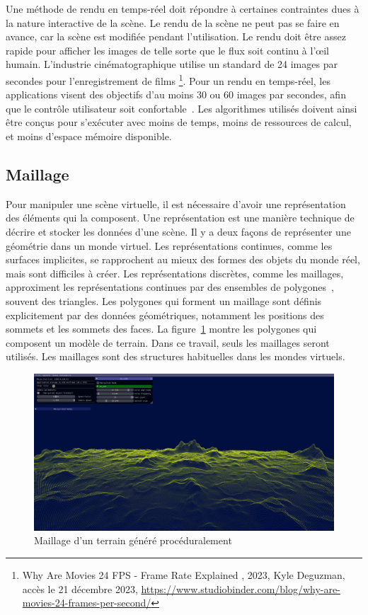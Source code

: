 Une méthode de rendu en temps-réel doit répondre à certaines contraintes dues à la nature interactive de la scène. Le rendu de la scène ne peut pas se faire en avance, car la scène est modifiée pendant l'utilisation. Le rendu doit être assez rapide pour afficher les images de telle sorte que le flux soit continu à l'œil humain. L'industrie cinématographique utilise un standard de 24 images par secondes pour l'enregistrement de films \footnote{\og Why Are Movies 24 FPS - Frame Rate Explained \fg, 2023, Kyle Deguzman, accès le 21 décembre 2023, \url{https://www.studiobinder.com/blog/why-are-movies-24-frames-per-second/}}. Pour un rendu en temps-réel, les applications visent des objectifs d'au moins 30 ou 60 images par secondes, afin que le contrôle utilisateur soit confortable~\cite{janzen_is_2014}. Les algorithmes utilisés doivent ainsi être conçus pour s'exécuter avec moins de temps, moins de ressources de calcul, et moins d'espace mémoire disponible.

\subsection{Maillage}

Pour manipuler une scène virtuelle, il est nécessaire d'avoir une représentation des éléments qui la composent. Une représentation est une manière technique de décrire et stocker les données d'une scène. Il y a deux façons de représenter une géométrie dans un monde virtuel. Les représentations continues, comme les surfaces implicites, se rapprochent au mieux des formes des objets du monde réel, mais sont difficiles à créer. Les représentations discrètes, comme les maillages, approximent les représentations continues par des ensembles de polygones~\cite{coons_surfaces_1967}, souvent des triangles. Les polygones qui forment un maillage sont définis explicitement par des données géométriques, notamment les positions des sommets et les sommets des faces. La figure~\ref{fig:procedural-mesh} montre les polygones qui composent un modèle de terrain. Dans ce travail, seuls les maillages seront utilisés. Les maillages sont des structures habituelles dans les mondes virtuels.

\begin{figure}[h]
    \centering
    \includegraphics[width=\textwidth]{contenu/resources/images/full_terrain}
    \caption{Maillage d'un terrain généré procéduralement}
    \label{fig:procedural-mesh}
\end{figure}

